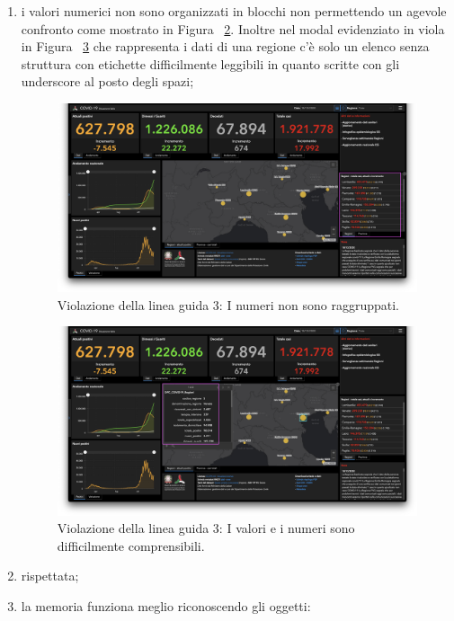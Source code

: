 \begin{enumerate}
\begin{enumerate}[label=\alph*.]
\begin{figure}[H]
                    \caption{Violazione della linea guida 2.e: le linee contengono meno di cinquanta caratteri.}
                    \label{fig:guidelines-violations-2}
                \end{figure}
        \end{enumerate}
    \item i valori numerici non sono organizzati in blocchi non permettendo un agevole confronto come mostrato in Figura ~\ref{fig:guidelines-violations-3}. Inoltre nel modal evidenziato in viola in Figura ~\ref{fig:guidelines-violations-4} che rappresenta i dati di una regione c'è solo un elenco senza struttura con etichette difficilmente leggibili in quanto scritte con gli underscore al posto degli spazi;
        \begin{figure}[H]
            \centering
            \includegraphics[width=0.5\columnwidth]{../../../assets/images/verifica-risorse-esistenti/guidelines_violations_3}
            \caption{Violazione della linea guida 3: I numeri non sono raggruppati.}
            \label{fig:guidelines-violations-3}
        \end{figure}
        \begin{figure}[H]
            \centering
            \includegraphics[width=0.5\columnwidth]{../../../assets/images/verifica-risorse-esistenti/guidelines_violations_4}
            \caption{Violazione della linea guida 3: I valori e i numeri sono difficilmente comprensibili.}
            \label{fig:guidelines-violations-4}
        \end{figure}
    \item rispettata; 
    \item la memoria funziona meglio riconoscendo gli oggetti:
        \begin{enumerate}[label=\alph*.]

\end{enumerate}
\end{enumerate}
